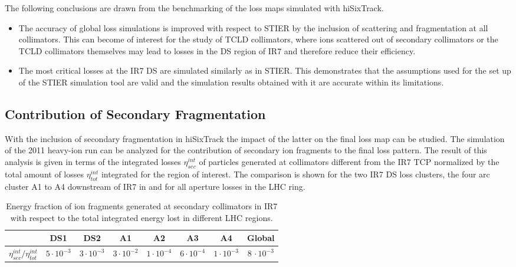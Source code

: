 The following conclusions are drawn from the benchmarking of the loss maps simulated with hiSixTrack. 

\begin{itemize}
  \item The accuracy of global loss simulations is improved with respect to STIER by the inclusion of scattering and fragmentation at all collimators. This can become of interest for the study of TCLD collimators, where ions scattered out of secondary collimators or the TCLD collimators themselves may lead to losses in the DS region of IR7 and therefore reduce their efficiency. 
  \item The most critical losses at the IR7 DS are simulated similarly as in STIER. This demonstrates that the assumptions used for the set up of the STIER simulation tool are valid and the simulation results obtained with it are accurate within its limitations. 
\end{itemize}




\subsection{Contribution of Secondary Fragmentation}

With the inclusion of secondary fragmentation in hiSixTrack the impact of the latter on the final loss map can be studied. The simulation of the 2011 heavy-ion run can be analyzed for the contribution of secondary ion fragments to the final loss pattern. The result of this analysis is given in terms of the integrated losses $\eta_{sec}^{int}$ of particles generated at collimators different from the IR7 TCP normalized by the total amount of losses $\eta_{tot}^{int}$ integrated for the region of interest. The comparison is shown for the two IR7 DS loss clusters, the four arc cluster A1 to A4 downstream of IR7 in  and for all aperture losses in the LHC ring. 
%
\begin{table}[b]
\centering
\caption{Energy fraction of ion fragments generated at secondary collimators in IR7 with respect to the total integrated energy lost in different LHC regions. }
\label{tab:secondary}
\begin{tabular}{cccccccc}
                                \toprule                                             & DS1              & DS2              & A1                 & A2                & A3                & A4              & Global \\ \midrule
$\eta_{sec}^{int}/\eta^{int}_{tot}$& $5\cdot 10^{-3}$ & $3\cdot 10^{-3}$ & $3\cdot 10^{-2}$ & $1 \cdot 10^{-4}$ & $6 \cdot 10^{-4}$ & $1\cdot10^{-3}$ & $8\,\cdot10^{-3}$  \\ \bottomrule
\end{tabular}
\end{table}
%

